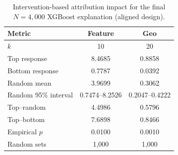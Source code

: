 
\begin{table}[H]
\centering
\caption{Intervention-based attribution impact for the final $N=4{,}000$ XGBoost explanation (aligned design).}
\label{tab:hull_intervention_impact_aligned}
\small
\begin{tabular}{lcc}
\toprule
Metric & Feature & Geo \\
\midrule
$k$ & 10 & 20 \\
Top response & 8.4685 & 0.8858 \\
Bottom response & 0.7787 & 0.0392 \\
Random mean & 3.9699 & 0.3062 \\
Random 95\% interval & 0.7474--8.2526 & 0.2047--0.4222 \\
Top--random & 4.4986 & 0.5796 \\
Top--bottom & 7.6898 & 0.8466 \\
Empirical $p$ & 0.0100 & 0.0010 \\
Random sets & 1,000 & 1,000 \\
\bottomrule
\end{tabular}
\end{table}

